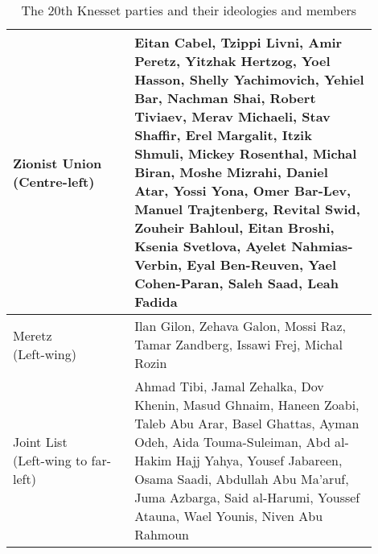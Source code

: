 \begin{table}
\begin{tabular}{|p{0.3\linewidth}|p{0.6\linewidth}|}
\hline
\makecell{Zionist Union \\ (Centre-left)}  & Eitan Cabel, Tzippi Livni, Amir Peretz, Yitzhak Hertzog, Yoel Hasson, Shelly Yachimovich, Yehiel Bar, Nachman Shai, Robert Tiviaev, Merav Michaeli, Stav Shaffir, Erel Margalit, Itzik Shmuli, Mickey Rosenthal, Michal Biran, Moshe Mizrahi, Daniel Atar, Yossi Yona, Omer Bar-Lev, Manuel Trajtenberg, Revital Swid, Zouheir Bahloul, Eitan Broshi, Ksenia Svetlova, Ayelet Nahmias-Verbin, Eyal Ben-Reuven, Yael Cohen-Paran, Saleh Saad, Leah Fadida    \\
\hline
\makecell{Meretz \\ (Left-wing)}  & Ilan Gilon, Zehava Galon, Mossi Raz, Tamar Zandberg, Issawi Frej, Michal Rozin                                                                                                                                                                                                                                                                                                                                                                              \\
\hline
\makecell{Joint List \\ (Left-wing to far-left)}  & Ahmad Tibi, Jamal Zehalka, Dov Khenin, Masud Ghnaim, Haneen Zoabi, Taleb Abu Arar, Basel Ghattas, Ayman Odeh, Aida Touma-Suleiman, Abd al-Hakim Hajj Yahya, Yousef Jabareen, Osama Saadi, Abdullah Abu Ma'aruf, Juma Azbarga, Said al-Harumi, Youssef Atauna, Wael Younis, Niven Abu Rahmoun                                                                                                                                                                \\
\hline
\end{tabular}
\caption{The 20th Knesset parties and their ideologies and members}
\label{table:knesset_party_members}
\end{table}


